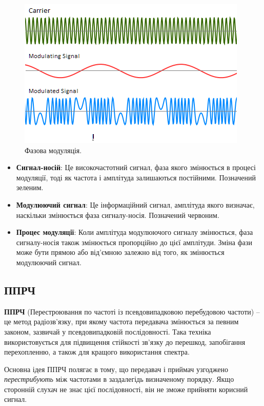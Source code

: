 \documentclass{article}
\begin{document}
\begin{figure}[h!]
\centering
\includegraphics[width=0.6\linewidth]{images/pm.png}
\caption{\label{fig:pm}Фазова модуляція.}
\end{figure}

\begin{itemize}[noitemsep, topsep=8pt]
\item \textbf{Сигнал-носій}: Це високочастотний сигнал, фаза якого змінюється в процесі модуляції, тоді як частота і амплітуда залишаються постійними. Позначений зеленим.
\item \textbf{Модулюючий сигнал}: Це інформаційний сигнал, амплітуда якого визначає, наскільки змінюється фаза сигналу-носія. Позначений червоним.
\item \textbf{Процес модуляції}: Коли амплітуда модулюючого сигналу змінюється, фаза сигналу-носія також змінюється пропорційно до цієї амплітуди. Зміна фази може бути прямою або від'ємною залежно від того, як змінюється модулюючий сигнал.
\end{itemize}

\subsection{ППРЧ}

\textbf{ППРЧ} (Перестроювання по частоті із псевдовипадковою перебудовою частоти) -- це метод радіозв'язку, при якому частота передавача змінюється за певним законом, зазвичай у псевдовипадковій послідовності. Така техніка використовується для підвищення стійкості зв'язку до перешкод, запобігання перехопленню, а також для кращого використання спектра.

Основна ідея ППРЧ полягає в тому, що передавач і приймач узгоджено \textit{перестрибують} між частотами в заздалегідь визначеному порядку. Якщо сторонній слухач не знає цієї послідовності, він не зможе прийняти корисний сигнал.
\end{document}
